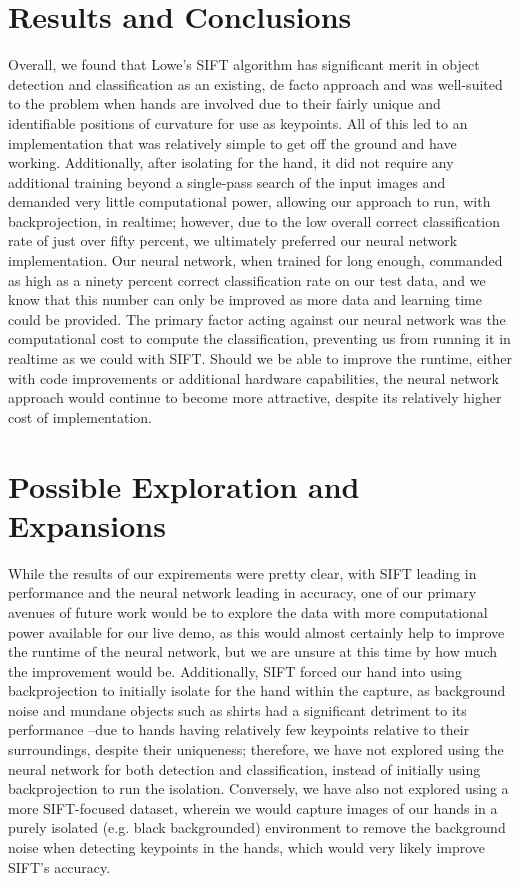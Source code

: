 \section{Results and Conclusions}

Overall, we found that Lowe's SIFT algorithm has significant merit in object detection and classification as an existing, de facto approach and was well-suited to the problem when hands are involved due to their fairly unique and identifiable positions of curvature for use as keypoints. All of this led to an implementation that was relatively simple to get off the ground and have working. Additionally, after isolating for the hand, it did not require any additional training beyond a single-pass search of the input images and demanded very little computational power, allowing our approach to run, with backprojection, in realtime; however, due to the low overall correct classification rate of just over fifty percent, we ultimately preferred our neural network implementation. Our neural network, when trained for long enough, commanded as high as a ninety percent correct classification rate on our test data, and we know that this number can only be improved as more data and learning time could be provided. The primary factor acting against our neural network was the computational cost to compute the classification, preventing us from running it in realtime as we could with SIFT. Should we be able to improve the runtime, either with code improvements or additional hardware capabilities, the neural network approach would continue to become more attractive, despite its relatively higher cost of implementation.

\section{Possible Exploration and Expansions}

While the results of our expirements were pretty clear, with SIFT leading in performance and the neural network leading in accuracy, one of our primary avenues of future work would be to explore the data with more computational power available for our live demo, as this would almost certainly help to improve the runtime of the neural network, but we are unsure at this time by how much the improvement would be. Additionally, SIFT forced our hand into using backprojection to initially isolate for the hand within the capture, as background noise and mundane objects such as shirts had a significant detriment to its performance --due to hands having relatively few keypoints relative to their surroundings, despite their uniqueness; therefore, we have not explored using the neural network for both detection and classification, instead of initially using backprojection to run the isolation. Conversely, we have also not explored using a more SIFT-focused dataset, wherein we would capture images of our hands in a purely isolated (e.g. black backgrounded) environment to remove the background noise when detecting keypoints in the hands, which would very likely improve SIFT's accuracy.